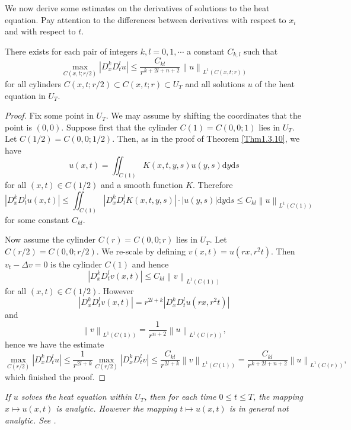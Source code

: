 We now derive some estimates on the derivatives of solutions to the heat equation. Pay attention to the differences between derivatives with respect to $x_i$ and with respect to $t$.
\begin{theorem}
There exists for each pair of integers $k,l=0,1,\cdots$ a constant $C_{k,l}$ such that 
$$
\max_{C\left( x,t;r/2 \right)} \left| D_{x}^{k}D_{t}^{l}u \right|\le \frac{C_{kl}}{r^{k+2l+n+2}}\left\| u \right\| _{L^1\left( C\left( x,t;r \right) \right)}
$$
for all cylinders $C(x,t;r/2)\subset C(x,t;r)\subset U_T$ and all solutions $u$ of the heat equation in $U_T$.
\end{theorem}
\begin{proof}
Fix some point in $U_T$. We may assume by shifting the coordinates that the point is $(0,0)$. Suppose first that the cylinder $C(1)=C(0,0;1)$ lies in $U_T$. Let $C(1/2)=C(0,0;1/2)$. Then, as in the proof of Theorem \ref{Thm1.3.10}, we have 
$$
u\left( x,t \right) =\iint_{C\left( 1 \right)}{K\left( x,t,y,s \right) u\left( y,s \right) \mathrm{d}y\mathrm{d}s}
$$
for all $(x,t)\in C(1/2)$ and a smooth function $K$. Therefore 
$$
\left| D_{x}^{k}D_{t}^{l}u\left( x,t \right) \right|\le \iint_{C\left( 1 \right)}{\left| D_{x}^{k}D_{t}^{l}K\left( x,t,y,s \right) \right|\cdot \left| u\left( y,s \right) \right|\mathrm{d}y\mathrm{d}s}\le C_{kl}\left\| u \right\| _{L^1\left( C\left( 1 \right) \right)}
$$
for some constant $C_{kl}$.\par
Now assume the cylinder $C(r)=C(0,0;r)$ lies in $U_T$. Let $C(r/2)=C(0,0;r/2)$. We re-scale by defining $v(x,t)=u(rx,r^2t)$. Then $v_t-\Delta v=0$ is the cylinder $C(1)$ and hence 
$$
\left| D_{x}^{k}D_{t}^{l}v\left( x,t \right) \right|\le C_{kl}\left\| v \right\| _{L^1\left( C\left( 1 \right) \right)}
$$
for all $(x,t)\in C(1/2)$. However 
$$
\left| D_{x}^{k}D_{t}^{l}v\left( x,t \right) \right|=r^{2l+k}\left| D_{x}^{k}D_{t}^{l}u\left( rx,r^2t \right) \right|
$$
and 
$$
\left\| v \right\| _{L^1\left( C\left( 1 \right) \right)}=\frac{1}{r^{n+2}}\left\| u \right\| _{L^1\left( C\left( r \right) \right)},
$$
hence we have the estimate 
$$
\max_{C\left( r/2 \right)} \left| D_{x}^{k}D_{t}^{l}u \right|\le \frac{1}{r^{2l+k}}\max_{C\left( r/2 \right)} \left| D_{x}^{k}D_{t}^{l}v \right|\le \frac{C_{kl}}{r^{2l+k}}\left\| v \right\| _{L^1\left( C\left( 1 \right) \right)}=\frac{C_{kl}}{r^{k+2l+n+2}}\left\| u \right\| _{L^1\left( C\left( r \right) \right)},
$$
which finished the proof.
\end{proof}
\begin{note}\em
If $u$ solves the heat equation within $U_T$, then for each time $0\le t\le T$, the mapping $x\mapsto u(x,t)$ is analytic. However the mapping $t\mapsto u(x,t)$ is in general not analytic. See \cite{Mik1978partial}.
\end{note}
